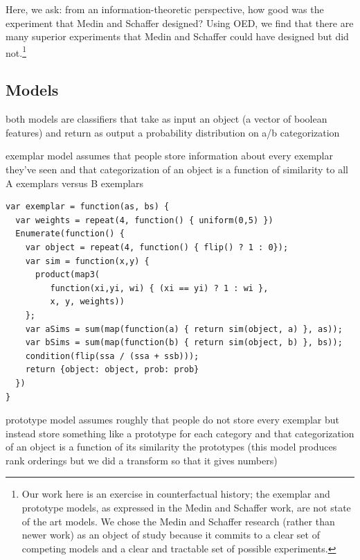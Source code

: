 \documentclass{article}
\newcommand{\lou}[1]{\textcolor{orange}{[lou: #1]}}
\newcommand{\cas}[1]{ \textsf{\color{darkgray} \scriptsize #1} }
\begin{document}
Here, we ask: from an information-theoretic perspective, how good was the experiment that Medin and Schaffer designed?
Using OED, we find that there are many superior experiments that Medin and Schaffer could have designed but did not.\footnote{Our work here is an exercise in counterfactual history; the exemplar and prototype models, as expressed in the Medin and Schaffer work, are not state of the art models. We chose the Medin and Schaffer research (rather than newer work) as an object of study because it commits to a clear set of competing models and a clear and tractable set of possible experiments.}



\subsection{Models}

\cas{both models are classifiers that take as input an object (a vector of boolean features) and return as output a probability distribution on a/b categorization}

\cas{exemplar model assumes that people store information about every exemplar they've seen and that categorization of an object is a function of similarity to all A exemplars versus B exemplars}

\begin{lstlisting}[caption=Exemplar model (TODO: clearer input/output types)]
var exemplar = function(as, bs) {
  var weights = repeat(4, function() { uniform(0,5) })
  Enumerate(function() {
    var object = repeat(4, function() { flip() ? 1 : 0});
    var sim = function(x,y) {
      product(map3(
         function(xi,yi, wi) { (xi == yi) ? 1 : wi },
         x, y, weights))
    };
    var aSims = sum(map(function(a) { return sim(object, a) }, as));
    var bSims = sum(map(function(b) { return sim(object, b) }, bs));
    condition(flip(ssa / (ssa + ssb)));
    return {object: object, prob: prob}
  })
}
\end{lstlisting}

\cas{prototype model assumes roughly that people do not store every exemplar but instead store something like a prototype for each category and that categorization of an object is a function of its similarity the prototypes (this model produces rank orderings but we did a transform so that it gives numbers)}
\end{document}
